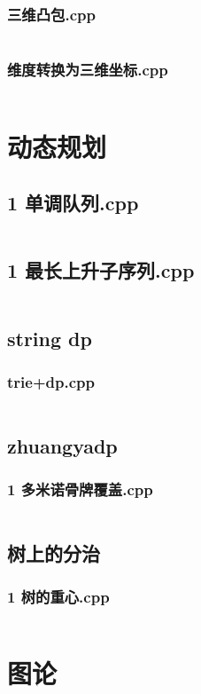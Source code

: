 \documentclass[a4paper,11pt]{article}
\begin{document}
\subsubsection{三维凸包.cpp}
\inputminted{c++}{"D:/tmplz/templates/几何/3D/三维凸包.cpp"}
\subsubsection{维度转换为三维坐标.cpp}
\inputminted{c++}{"D:/tmplz/templates/几何/3D/维度转换为三维坐标.cpp"}
\section{动态规划}
\subsection{1 单调队列.cpp}
\inputminted{c++}{"D:/tmplz/templates/动态规划/1 单调队列.cpp"}
\subsection{1 最长上升子序列.cpp}
\inputminted{c++}{"D:/tmplz/templates/动态规划/1 最长上升子序列.cpp"}
\subsection{string dp}
\subsubsection{trie+dp.cpp}
\inputminted{c++}{"D:/tmplz/templates/动态规划/string dp/trie+dp.cpp"}
\subsection{zhuangyadp}
\subsubsection{1 多米诺骨牌覆盖.cpp}
\inputminted{c++}{"D:/tmplz/templates/动态规划/zhuangyadp/1 多米诺骨牌覆盖.cpp"}
\subsection{树上的分治}
\subsubsection{1 树的重心.cpp}
\inputminted{c++}{"D:/tmplz/templates/动态规划/树上的分治/1 树的重心.cpp"}
\section{图论}
\end{document}
